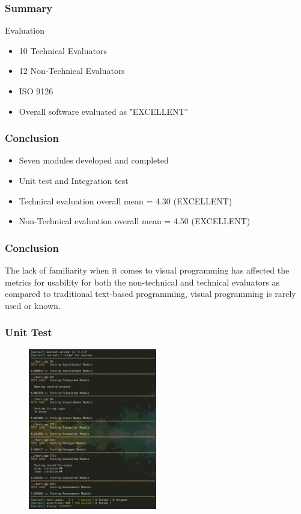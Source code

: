 \documentclass{beamer}
\newcommand{\parx}{
	\setlength{\parindent}{4em}
	\par}
\begin{document}
\begin{frame}
	\frametitle{Summary}
	\begin{block}{Evaluation}
		\begin{itemize}
			\item<1-> 10 Technical Evaluators
			\item<2-> 12 Non-Technical Evaluators
			\item<3-> ISO 9126
			\item<4-> Overall software evaluated as "EXCELLENT"
		\end{itemize}
	\end{block}
\end{frame}

\begin{frame}
	\frametitle{Conclusion}
	\begin{itemize}
		\item<1-> Seven modules developed and completed
		\item<2-> Unit test and Integration test
		\item<3-> Technical evaluation overall mean = 4.30 (EXCELLENT)
		\item<4-> Non-Technical evaluation overall mean = 4.50 (EXCELLENT)
	\end{itemize}
\end{frame}

\begin{frame}
	\frametitle{Conclusion}
	\justifying
	\parx
	The lack of familiarity when it comes to visual programming has affected the
	metrics for usability for both the non-technical and technical evaluators
	as compared to traditional text-based programming, visual programming is
	rarely used or known.
\end{frame}

\begin{frame}
	\frametitle{Unit Test}
	\begin{figure}
		\includegraphics[width=0.5\textwidth]{figures/unit_test.png}
	\end{figure}
\end{frame}
\end{document}
